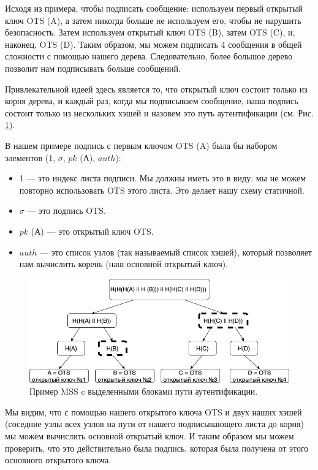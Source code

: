 \documentclass[a4paper, 14pt]{extarticle}
\begin{document}
Исходя из примера, чтобы подписать сообщение: используем первый открытый ключ OTS (A), а затем никогда больше не используем его, чтобы не нарушить безопасность. Затем используем открытый ключ OTS (B), затем OTS (C), и, наконец, OTS (D). Таким образом, мы можем подписать 4 сообщения в общей сложности с помощью нашего дерева. Следовательно, более большое дерево позволит нам подписывать больше сообщений.

Привлекательной идеей здесь является то, что открытый ключ состоит только из корня дерева, и каждый раз, когда мы подписываем сообщение, наша подпись состоит только из нескольких хэшей и назовем это путь аутентификации (см. Рис. \ref{fig:MSS_auth_path}).

В нашем примере подпись с первым ключом OTS (A) была бы набором элементов (1, $\sigma$, $pk$ (А), $auth$):

\begin{itemize}
    \item 1 --- это индекс листа подписи. Мы должны иметь это в виду: мы не можем повторно использовать OTS этого листа. Это делает нашу схему статичной.
    \item $\sigma$ --- это подпись OTS.
    \item $pk$ (А) --- это открытый ключ OTS.
    \item $auth$ --- это список узлов (так называемый список хэшей), который позволяет нам вычислить корень (наш основной открытый ключ).
\end{itemize}

\begin{figure}[h]
    \centering
    \includegraphics[scale=0.66]{MSS_auth_path.png}
    \caption{Пример MSS c выделенными блоками пути аутентификации.}
    \label{fig:MSS_auth_path}
\end{figure}

Мы видим, что с помощью нашего открытого ключа OTS и двух наших хэшей (соседние узлы всех узлов на пути от нашего подписывающего листа до корня) мы можем вычислить основной открытый ключ. И таким образом мы можем проверить, что это действительно была подпись, которая была получена от этого основного открытого ключа.
\end{document}
